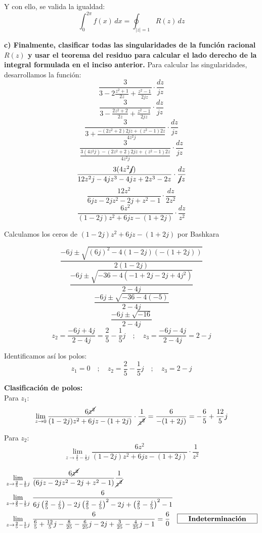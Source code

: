 \documentclass[12pt,a4paper]{report}
\begin{document}
Y con ello, se valida la igualdad:
$$ \int_{0}^{2\pi} f(x) \, dx = \oint_{|z|=1} R(z) \, dz$$ 

\vspace{6cm}

\textbf{c)  Finalmente, clasificar todas las singularidades de la función racional $R(z)$ y usar el teorema del residuo para calcular el lado derecho de la integral formulada en el inciso anterior.}
Para calcular las singularidades, desarrollamos la función:
$$\frac{3}{3 - 2\frac{z^{2} + 1}{2z} + \frac{z^{2} - 1}{2jz}} \cdot \frac{dz}{jz}$$ 
$$\frac{3}{3 - \frac{2z^{2} + 2}{2z} + \frac{z^{2} - 1}{2jz}} \cdot \frac{dz}{jz}$$ 
$$\frac{3}{3 + \frac{-(2z^{2} + 2)2jz + (z^2-1)2z}{4z^2j}} \cdot \frac{dz}{jz}$$ 
$$\frac{3}{\frac{3(4z^2j) - (2z^{2} + 2)2jz + (z^2-1)2z}{4z^2j}} \cdot \frac{dz}{jz}$$ 
$$\frac{3(4z^2\cancel{j})}{12z^2j - 4jz^{3} - 4jz + 2z^3 - 2z} \cdot \frac{dz}{\cancel{j}z}$$ 
$$\frac{12z^2}{6jz - 2jz^{2} - 2j + z^2 - 1} \cdot \frac{dz}{2z^2}$$ 
$$\frac{6z^2}{(1- 2j)z^{2} + 6jz - (1 + 2j)} \cdot \frac{dz}{z^2}$$ 

Calculamos los ceros de $(1- 2j)z^{2} + 6jz - (1 + 2j)$ por Bashkara

$$\frac{-6j \pm \sqrt{(6j)^2-4(1-2j)(-(1+2j))}} {2(1-2j)} $$
$$\frac{-6j \pm \sqrt{-36-4(-1+2j-2j+4j^2)}} {2-4j} $$
$$\frac{-6j \pm \sqrt{-36-4(-5)}} {2-4j} $$
$$\frac{-6j \pm \sqrt{-16}} {2-4j} $$
$$z_2 = \frac{-6j + 4j} {2-4j} = \frac{2}{5}-\frac{1}{5}j\quad;\quad z_3 = \frac{-6j - 4j} {2-4j} = 2-j$$

Identificamos así los polos:
$$z_1=0\quad;\quad z_2=\frac{2}{5}-\frac{1}{5}j \quad;\quad z_3=2-j$$

\vspace{2cm}

\textbf{Clasificación de polos:}\\[6pt]
Para $z_1$:
$$\lim_{z \to 0}\frac{6\cancel{z^2}}{(1- 2j)z^{2} + 6jz - (1 + 2j)} \cdot \frac{1}{\cancel{z^2}}
=\frac{6}{- (1 + 2j)}=-\frac{6}{5}+\frac{12}{5}j$$ 
\begin{center}\end{center}

Para $z_2$:
$$\lim_{z \to \frac{2}{5}-\frac{1}{5}j}\frac{6z^2}{(1- 2j)z^{2} + 6jz - (1 + 2j)} \cdot \frac{1}{z^2}
$$

\begin{align*}
&\lim_{z \to \frac{2}{5}-\frac{1}{5}j}\,\frac{6\cancel{z^2}}{(6jz-2jz^2-2j+z^2-1)}\frac{1}{\cancel{z^2}}\\
& \lim_{z \to \frac{2}{5}-\frac{1}{5}j}\, \frac{6}{6j\left(\frac{2}{5}-\frac{j}{5} \right)-2j\left(\frac{2}{5}-\frac{j}{5} \right)^2-2j+\left(\frac{2}{5}-\frac{j}{5} \right)^2-1}\\
&\lim_{z \to \frac{2}{5}-\frac{1}{5}j}\,\frac{6}{\frac{6}{5}+\frac{12}{5}j-\frac{8}{25}-\frac{6}{25}j-2j+\frac{3}{25}-\frac{4}{25}j-1}=\frac{6}{0} \quad \framebox[4cm][c]{\textbf{Indeterminación}}\\
\end{align*}
\end{document}
